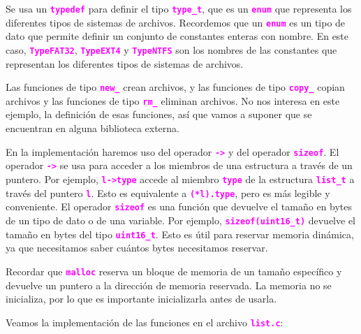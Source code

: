 \documentclass[]{scrartcl}
\newcommand{\hl}[1]{\textcolor{magenta}{\textbf{\texttt{#1}}}}
\begin{document}
Se usa un \hl{typedef} para definir el tipo \hl{type\_t}, que es un \hl{enum} que representa los diferentes tipos de sistemas de archivos. Recordemos que un \hl{enum} es un tipo de dato que permite definir un conjunto de constantes enteras con nombre. En este caso, \hl{TypeFAT32}, \hl{TypeEXT4} y \hl{TypeNTFS} son los nombres de las constantes que representan los diferentes tipos de sistemas de archivos.

Las funciones de tipo \hl{new\_} crean archivos, y las funciones de tipo \hl{copy\_} copian archivos y las funciones de tipo \hl{rm\_} eliminan archivos. No nos interesa en este ejemplo, la definición de esas funciones, así que vamos a suponer que se encuentran en alguna biblioteca externa.

En la implementación haremos uso del operador \hl{->} y del operador \hl{sizeof}. El operador \hl{->} se usa para acceder a los miembros de una estructura a través de un puntero. Por ejemplo, \hl{l->type} accede al miembro \hl{type} de la estructura \hl{list\_t} a través del puntero \hl{l}. Esto es equivalente a \hl{(*l).type}, pero es más legible y conveniente. El operador \hl{sizeof} es una función que devuelve el tamaño en bytes de un tipo de dato o de una variable. Por ejemplo, \hl{sizeof(uint16\_t)} devuelve el tamaño en bytes del tipo \hl{uint16\_t}. Esto es útil para reservar memoria dinámica, ya que necesitamos saber cuántos bytes necesitamos reservar.

Recordar que \hl{malloc} reserva un bloque de memoria de un tamaño específico y devuelve un puntero a la dirección de memoria reservada. La memoria no se inicializa, por lo que es importante inicializarla antes de usarla.

Veamos la implementación de las funciones en el archivo \hl{list.c}:
\end{document}

